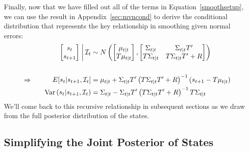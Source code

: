 \documentclass[a4paper,12pt]{article}
\begin{document}
Finally, now that we have filled out all of the terms in
Equation~\ref{smoothsetup}, we can use the result in
Appendix~\ref{sec:mvncond} to derive the conditional distribution that
represents the key relationship in smoothing given normal errors:
\begin{alignat}{3}
  &&\left. \begin{bmatrix} s_t \\ s_{t+1} \end{bmatrix} \;\right\rvert
    \mathcal{I}_t
    &\sim N\left(
    \begin{bmatrix} \mu_{t|t} \\ T\mu_{t|t} \end{bmatrix},
    \begin{bmatrix} \Sigma_{t|t} & \Sigma_{t|t}T' \\
                    T\Sigma_{t|t} & T\Sigma_{t|t} T'+R \end{bmatrix}
    \right) \notag\\\label{smoothresult}\\
  \Rightarrow \quad
  &&E[s_t|s_{t+1}, \mathcal{I}_t] &=
      \mu_{t|t} + \Sigma_{t|t}T'\left(T\Sigma_{t|t} T'+R\right)^{-1}
      (s_{t+1}-T\mu_{t|t}) \notag\\
  &&\text{Var}\left(s_t|s_{t+1},\mathcal{I}_t\right)
    &= \Sigma_{t|t} - \Sigma_{t|t}T' \left(T\Sigma_{t|t} T'+R\right)^{-1}
      T\Sigma_{t|t}
  \notag
\end{alignat}
We'll come back to this recursive relationship in subsequent sections as
we draw from the full posterior distribution of the states.


\subsection{Simplifying the Joint Posterior of States}
\end{document}
